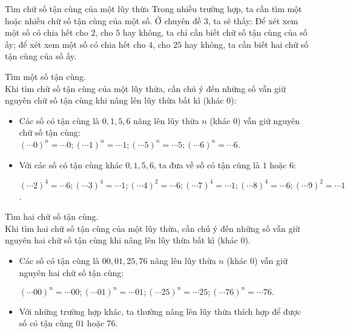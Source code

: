 \begin{dang}{Tìm chữ số tận cùng của một lũy thừa}
	Trong nhiều trường hợp, ta cần tìm một hoặc nhiều chữ số tận cùng của một số. Ở chuyên đề 3, ta sẽ thấy: Để xét xem một số có chia hết cho $2$, cho $5$ hay không, ta chỉ cần biết chữ số tận cùng của số ấy; để xét xem một số có chia hết cho $4$, cho $25$ hay không, ta cần biết hai chữ số tận cùng của số ấy.
	\begin{listEX}
		\item 	Tìm một số tận cùng.\\
		Khi tìm chữ số tận cùng của một lũy thừa, cần chú ý đến những số vẫn giữ nguyên chữ số tận cùng khi nâng lên lũy thừa bất kì (khác $0$):
		\begin{itemize}
			\item Các số có tận cùng là $0, 1, 5, 6$ nâng lên lũy thừa $n$ (khác $0$) vẫn giữ nguyên chữ số tận cùng:\\
			$(\cdots 0)^n=\cdots 0; (\cdots 1)^n=\cdots 1; (\cdots 5)^n=\cdots 5; (\cdots 6)^n=\cdots 6$.
			\item Với các số có tận cùng khác $0, 1, 5, 6$, ta đưa về số có tận cùng là $1$ hoặc $6$:
			\begin{center}
				$(\cdots 2)^4=\cdots 6; (\cdots 3)^4=\cdots 1; (\cdots 4)^2=\cdots 6; (\cdots 7)^4=\cdots 1;(\cdots 8)^4=\cdots 6; (\cdots 9)^2=\cdots 1$.    
			\end{center}
		\end{itemize} 
		\item 	Tìm hai chữ số tận cùng.\\
		Khi tìm hai chữ số tận cùng của một lũy thừa, cần chú ý đến những số vẫn giữ nguyên hai chữ số tận cùng khi nâng lên lũy thừa bất kì (khác $0$).
		\begin{itemize}
			\item Các số có tận cùng là $00, 01, 25, 76$ nâng lên lũy thừa $n$ (khác $0$) vẫn giữ nguyên hai chữ số tận cùng:
			\begin{center}
				$(\cdots 00)^n=\cdots 00; (\cdots 01)^n=\cdots 01; (\cdots 25)^n=\cdots 25; (\cdots 76)^n=\cdots 76.$ 
			\end{center}
			\item Với những trường hợp khác, ta thường nâng lên lũy thừa thích hợp để được số có tận cùng $01$ hoặc $76$.
		\end{itemize}
	\end{listEX}
\end{dang}

